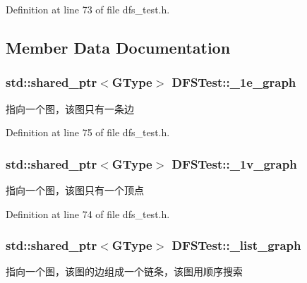 Definition at line 73 of file dfs\+\_\+test.\+h.



\subsection{Member Data Documentation}
\hypertarget{class_d_f_s_test_ae5351e523345888ffc64aa892d93d3c2}{}
\subsubsection[{\+\_\+1e\+\_\+graph}]{\setlength{\rightskip}{0pt plus 5cm}std\+::shared\+\_\+ptr$<${\bf G\+Type}$>$ D\+F\+S\+Test\+::\+\_\+1e\+\_\+graph\hspace{0.3cm}{\ttfamily [protected]}}\label{class_d_f_s_test_ae5351e523345888ffc64aa892d93d3c2}
指向一个图，该图只有一条边 

Definition at line 75 of file dfs\+\_\+test.\+h.

\hypertarget{class_d_f_s_test_a4dbae7784992bee522457b53da2141c2}{}
\subsubsection[{\+\_\+1v\+\_\+graph}]{\setlength{\rightskip}{0pt plus 5cm}std\+::shared\+\_\+ptr$<${\bf G\+Type}$>$ D\+F\+S\+Test\+::\+\_\+1v\+\_\+graph\hspace{0.3cm}{\ttfamily [protected]}}\label{class_d_f_s_test_a4dbae7784992bee522457b53da2141c2}
指向一个图，该图只有一个顶点 

Definition at line 74 of file dfs\+\_\+test.\+h.

\hypertarget{class_d_f_s_test_a9607eac5350c4cdd449c353fed482efc}{}
\subsubsection[{\+\_\+list\+\_\+graph}]{\setlength{\rightskip}{0pt plus 5cm}std\+::shared\+\_\+ptr$<${\bf G\+Type}$>$ D\+F\+S\+Test\+::\+\_\+list\+\_\+graph\hspace{0.3cm}{\ttfamily [protected]}}\label{class_d_f_s_test_a9607eac5350c4cdd449c353fed482efc}
指向一个图，该图的边组成一个链条，该图用顺序搜索 

